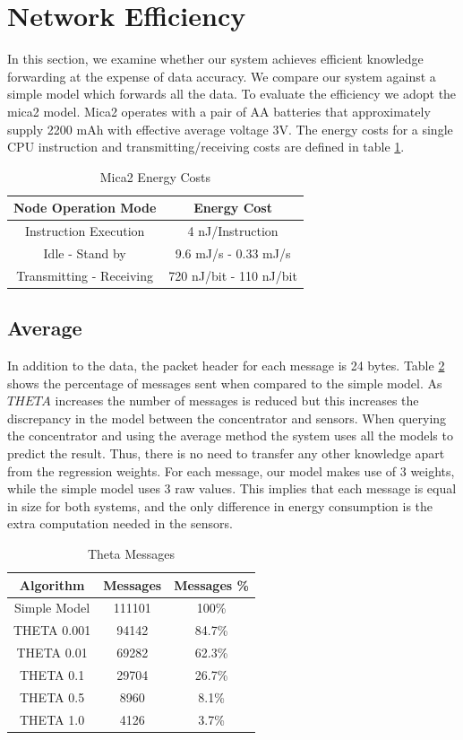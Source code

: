 \documentclass{mproj}
\begin{document}
\section{Network Efficiency}
\label{sec:networkefficiency}
In this section, we examine whether our system achieves efficient knowledge forwarding at the expense of data accuracy. We compare our system against a simple model which forwards all the data. To evaluate the efficiency we adopt the mica2 \cite{mica2} model. Mica2 operates with a pair of AA batteries that approximately supply 2200 mAh with effective average voltage 3V. The energy costs for a single CPU instruction and transmitting/receiving costs are defined in table \ref{table:energy}.

 \begin{table}[!ht]
 \centering
 \begin{tabular}{||c | c||}
 \hline
 Node Operation Mode & Energy Cost \\
 \hline\hline
 Instruction Execution & 4 nJ/Instruction \\ 
 \hline
 Idle - Stand by & 9.6 mJ/s - 0.33 mJ/s\\
 \hline
 Transmitting - Receiving & 720 nJ/bit - 110 nJ/bit\\
 \hline
\end{tabular}
\caption{Mica2 Energy Costs}
 \label{table:energy} 
\end{table}

\subsection{Average}
In addition to the data, the packet header for each message is 24 bytes. Table \ref{table:thetaMessages} shows the percentage of messages sent when compared to the simple model. As $THETA$ increases the number of messages is reduced but this increases the discrepancy in the model between the concentrator and sensors. When querying the concentrator and using the average method the system uses all the models to predict the result. Thus, there is no need to transfer any other knowledge apart from the regression weights. For each message, our model makes use of 3 weights, while the simple model uses 3 raw values. This implies that each message is equal in size for both systems, and the only difference in energy consumption is the extra computation needed in the sensors.

\begin{table}[!ht]
 \centering
 \begin{tabular}{||c | c | c||}
 \hline
 Algorithm & Messages & Messages \%\\
 \hline\hline
 Simple Model & 111101 & 100\%\\ 
 \hline
 THETA 0.001 & 94142 & 84.7\%\\
 \hline
 THETA 0.01 & 69282 & 62.3\%\\
 \hline
 THETA 0.1 & 29704 & 26.7\%\\
 \hline
 THETA 0.5 & 8960 & 8.1\%\\
 \hline
 THETA 1.0 & 4126 & 3.7\%\\
 \hline
\end{tabular}
\caption{Theta Messages}
 \label{table:thetaMessages} 
\end{table}
\end{document}
